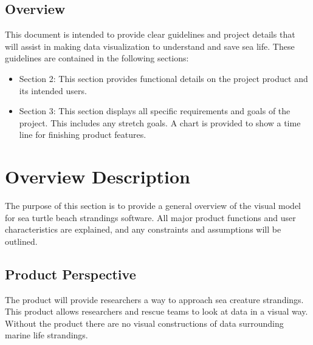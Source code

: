 \documentclass[onecolumn, draftclsnofoot,10pt, compsoc]{IEEEtran}
\begin{document}
\begin{singlespace}
\subsection{Overview}
    This document is intended to provide clear guidelines and project details that will assist in making data visualization to understand and save sea life.
    These guidelines are contained in the following sections:
    \begin{itemize}
        \item Section 2: This section provides functional details on the project product and its intended users.
        \item Section 3: This section displays all specific requirements and goals of the project.  This includes any stretch goals. A chart is provided to show a time line for finishing product features.
    \end{itemize}
\section{Overview Description}
The purpose of this section is to provide a general overview of the visual model for sea turtle beach strandings software. All major product functions and user characteristics are explained, and any constraints and assumptions will be outlined.
\subsection{Product Perspective}
The product will provide researchers a way to approach sea creature strandings. This product allows researchers and rescue teams to look at data in a visual way. Without the product there are no visual constructions of data surrounding marine life strandings.

\end{singlespace}
\end{document}
